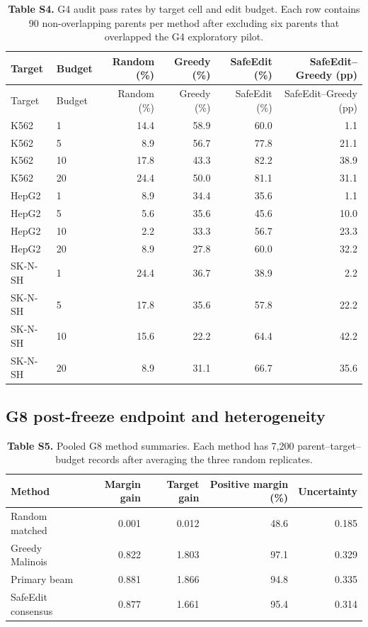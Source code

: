 \documentclass[10pt,a4paper]{article}
\begin{document}
\begin{longtable}{llrrrr}
\caption{\textbf{Table S4.} G4 audit pass rates by target cell and edit budget. Each row contains 90
non-overlapping parents per method after excluding six parents that overlapped the G4 exploratory pilot.}\label{tab:S4}\\
\toprule
Target & Budget & Random (\%) & Greedy (\%) & SafeEdit (\%) & SafeEdit--Greedy (pp) \\
\midrule
\endfirsthead
\toprule
Target & Budget & Random (\%) & Greedy (\%) & SafeEdit (\%) & SafeEdit--Greedy (pp) \\
\midrule
\endhead
K562 & 1 & 14.4 & 58.9 & 60.0 & 1.1 \\
K562 & 5 & 8.9 & 56.7 & 77.8 & 21.1 \\
K562 & 10 & 17.8 & 43.3 & 82.2 & 38.9 \\
K562 & 20 & 24.4 & 50.0 & 81.1 & 31.1 \\
HepG2 & 1 & 8.9 & 34.4 & 35.6 & 1.1 \\
HepG2 & 5 & 5.6 & 35.6 & 45.6 & 10.0 \\
HepG2 & 10 & 2.2 & 33.3 & 56.7 & 23.3 \\
HepG2 & 20 & 8.9 & 27.8 & 60.0 & 32.2 \\
SK-N-SH & 1 & 24.4 & 36.7 & 38.9 & 2.2 \\
SK-N-SH & 5 & 17.8 & 35.6 & 57.8 & 22.2 \\
SK-N-SH & 10 & 15.6 & 22.2 & 64.4 & 42.2 \\
SK-N-SH & 20 & 8.9 & 31.1 & 66.7 & 35.6 \\
\bottomrule
\end{longtable}

\subsection{G8 post-freeze endpoint and heterogeneity}

\begin{table}[ht]
\centering
\caption{\textbf{Table S5.} Pooled G8 method summaries. Each method has 7,200 parent--target--budget
records after averaging the three random replicates.}
\label{tab:S5}
\begin{tabular}{lrrrr}
\toprule
Method & Margin gain & Target gain & Positive margin (\%) & Uncertainty \\
\midrule
Random matched & 0.001 & 0.012 & 48.6 & 0.185 \\
Greedy Malinois & 0.822 & 1.803 & 97.1 & 0.329 \\
Primary beam & 0.881 & 1.866 & 94.8 & 0.335 \\
SafeEdit consensus & 0.877 & 1.661 & 95.4 & 0.314 \\
\bottomrule
\end{tabular}
\end{table}
\end{document}
